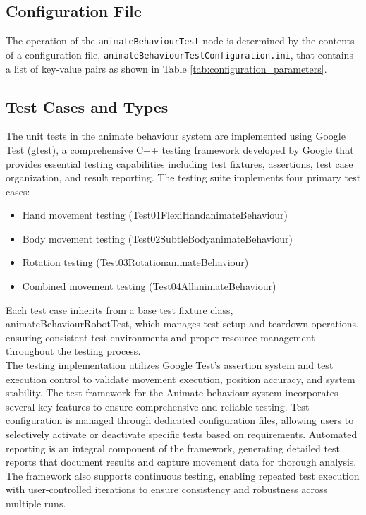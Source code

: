 \documentclass{CSSRforAfrica}
\begin{document}
\subsection*{Configuration File}
\label{sec:test configuration file}
The operation of the \texttt{animateBehaviourTest} node is determined by the contents of a configuration file, \texttt{animateBehaviourTestConfiguration.ini}, that contains a list of key-value pairs as shown in Table \ref{tab:configuration_parameters}.

\subsection{Test Cases and Types}
The unit tests in the animate behaviour system are implemented using Google Test (gtest), a comprehensive C++ testing framework developed by Google that provides essential testing capabilities including test fixtures, assertions, test case organization, and result reporting. The testing suite implements four primary test cases:
\begin{itemize}
    \item Hand movement testing (Test01FlexiHandanimateBehaviour)
    \item Body movement testing (Test02SubtleBodyanimateBehaviour)
    \item Rotation testing (Test03RotationanimateBehaviour)
    \item Combined movement testing (Test04AllanimateBehaviour)
\end{itemize}
Each test case inherits from a base test fixture class, animateBehaviourRobotTest, which manages test setup and teardown operations, ensuring consistent test environments and proper resource management throughout the testing process.
\\[1em]
The testing implementation utilizes Google Test's assertion system and test execution control to validate movement execution, position accuracy, and system stability. The test framework for the Animate behaviour system incorporates several key features to ensure comprehensive and reliable testing. Test configuration is managed through dedicated configuration files, allowing users to selectively activate or deactivate specific tests based on requirements. Automated reporting is an integral component of the framework, generating detailed test reports that document results and capture movement data for thorough analysis. The framework also supports continuous testing, enabling repeated test execution with user-controlled iterations to ensure consistency and robustness across multiple runs.
\end{document}

